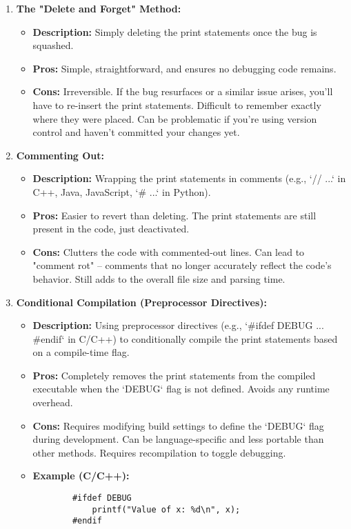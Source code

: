 \documentclass{article}
\begin{document}
{{{\begin{enumerate}
    \item \textbf{The "Delete and Forget" Method:}
    \begin{itemize}
        \item \textbf{Description:} Simply deleting the print statements once the bug is squashed.
        \item \textbf{Pros:} Simple, straightforward, and ensures no debugging code remains.
        \item \textbf{Cons:}  Irreversible. If the bug resurfaces or a similar issue arises, you'll have to re-insert the print statements.  Difficult to remember exactly where they were placed.  Can be problematic if you're using version control and haven't committed your changes yet.
    \end{itemize}

    \item \textbf{Commenting Out:}
    \begin{itemize}
        \item \textbf{Description:}  Wrapping the print statements in comments (e.g., `// ...` in C++, Java, JavaScript, `# ...` in Python).
        \item \textbf{Pros:}  Easier to revert than deleting. The print statements are still present in the code, just deactivated.
        \item \textbf{Cons:} Clutters the code with commented-out lines.  Can lead to "comment rot" – comments that no longer accurately reflect the code's behavior. Still adds to the overall file size and parsing time.
    \end{itemize}

    \item \textbf{Conditional Compilation (Preprocessor Directives):}
    \begin{itemize}
        \item \textbf{Description:} Using preprocessor directives (e.g., `#ifdef DEBUG ... #endif` in C/C++) to conditionally compile the print statements based on a compile-time flag.
        \item \textbf{Pros:}  Completely removes the print statements from the compiled executable when the `DEBUG` flag is not defined.  Avoids any runtime overhead.
        \item \textbf{Cons:} Requires modifying build settings to define the `DEBUG` flag during development. Can be language-specific and less portable than other methods. Requires recompilation to toggle debugging.
        \item \textbf{Example (C/C++):}
        \begin{verbatim}
        #ifdef DEBUG
            printf("Value of x: %d\n", x);
        #endif
        \end{verbatim}
    \end{itemize}


\end{enumerate}}}}
\end{document}
